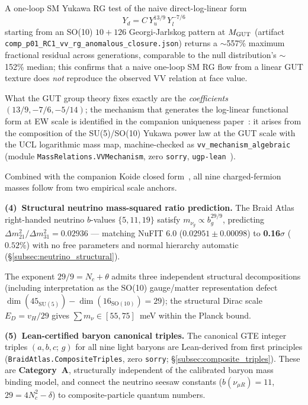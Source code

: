 \documentclass[11pt]{article}
\theoremstyle{remark}
\begin{document}
A one-loop SM Yukawa RG test of the naive direct-log-linear form
\[
  Y_d = C\,Y_u^{13/9}\,Y_l^{-7/6}
\]
starting from an SO(10) $10+126$ Georgi-Jarlskog pattern at $M_{\rm GUT}$
(artifact \texttt{comp\_p01\_RC1\_\allowbreak vv\_rg\_\allowbreak anomalous\_closure.json})
returns a $\sim$557\% maximum fractional residual across generations, comparable to the null distribution's $\sim$152\% median; this confirms that a naive one-loop SM RG flow from a linear GUT texture does \emph{not} reproduce the observed VV relation at face value.

What the GUT group theory fixes exactly are the \emph{coefficients} $(13/9, -7/6, -5/14)$; the mechanism that generates the log-linear functional form at EW scale is identified in the companion uniqueness paper~\cite{Spivack2026_Uniqueness25}: it arises from the composition of the SU(5)/SO(10) Yukawa power law at the GUT scale with the UCL logarithmic mass map, machine-checked as \texttt{vv\_mechanism\_algebraic} (module \texttt{MassRelations.VVMechanism}, zero \texttt{sorry}, \texttt{ugp-lean}~\cite{ugp-lean}).

Combined with the companion Koide closed form~\cite{Spivack2026_Koide}, all nine charged-fermion masses follow from two empirical scale anchors.


\medskip
\noindent\textbf{(4)~Structural neutrino mass-squared ratio prediction.}
The Braid Atlas right-handed neutrino $b$-values $\{5, 11, 19\}$ satisfy $m_{\nu_g} \propto b_g^{29/9}$, predicting $\Delta m^2_{21}/\Delta m^2_{31} = 0.02936$ --- matching NuFIT 6.0 ($0.02951 \pm 0.00098$) to \textbf{0.16$\sigma$} ($0.52\%$) with no free parameters and normal hierarchy automatic (\S\ref{subsec:neutrino_structural}).

The exponent $29/9 = N_c + \theta$ admits three independent structural decompositions (including interpretation as the SO(10) gauge/matter representation defect $\dim(45_{\mathrm{SU}(5)}) - \dim(16_{\mathrm{SO}(10)}) = 29$); the structural Dirac scale $E_D = v_H/29$ gives $\sum m_\nu \in [55, 75]$~meV within the Planck bound.


\medskip
\noindent\textbf{(5)~Lean-certified baryon canonical triples.}
The canonical GTE integer triples $(a,b,c;\,g)$ for all nine light baryons are Lean-derived from first principles (\texttt{BraidAtlas.CompositeTriples}, zero \texttt{sorry}; \S\ref{subsec:composite_triples}).  These are \textbf{Category~A}, structurally independent of the calibrated baryon mass binding model, and connect the neutrino seesaw constants ($b(\nu_{\mu R}) = 11$, $29 = 4N_c^2 - \delta$) to composite-particle quantum numbers.
\end{document}
